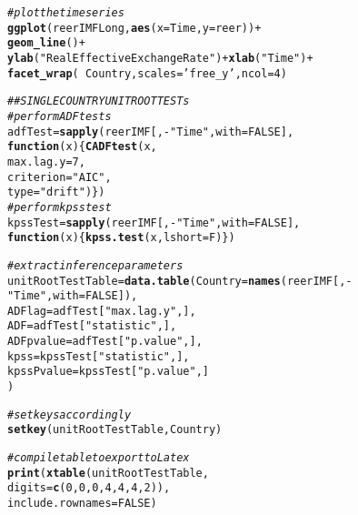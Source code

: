 \documentclass{article}\usepackage[]{graphicx}\usepackage[]{color}
\makeatletter
\newcommand{\hlnum}[1]{\textcolor[rgb]{0.686,0.059,0.569}{#1}}%
\newcommand{\hlstr}[1]{\textcolor[rgb]{0.192,0.494,0.8}{#1}}%
\newcommand{\hlcom}[1]{\textcolor[rgb]{0.678,0.584,0.686}{\textit{#1}}}%
\newcommand{\hlopt}[1]{\textcolor[rgb]{0,0,0}{#1}}%
\newcommand{\hlstd}[1]{\textcolor[rgb]{0.345,0.345,0.345}{#1}}%
\newcommand{\hlkwa}[1]{\textcolor[rgb]{0.161,0.373,0.58}{\textbf{#1}}}%
\newcommand{\hlkwb}[1]{\textcolor[rgb]{0.69,0.353,0.396}{#1}}%
\newcommand{\hlkwc}[1]{\textcolor[rgb]{0.333,0.667,0.333}{#1}}%
\newcommand{\hlkwd}[1]{\textcolor[rgb]{0.737,0.353,0.396}{\textbf{#1}}}%
\newenvironment{kframe}{%
 \def\at@end@of@kframe{}%
 \ifinner\ifhmode%
  \def\at@end@of@kframe{\end{minipage}}%
  \begin{minipage}{\columnwidth}%
 \fi\fi%
 \def\FrameCommand##1{\hskip\@totalleftmargin \hskip-\fboxsep
 \colorbox{shadecolor}{##1}\hskip-\fboxsep
     \hskip-\linewidth \hskip-\@totalleftmargin \hskip\columnwidth}%
 \MakeFramed {\advance\hsize-\width
   \@totalleftmargin\z@ \linewidth\hsize
   \@setminipage}}%
 {\par\unskip\endMakeFramed%
 \at@end@of@kframe}
\newenvironment{knitrout}{}{} %
\makeatother
\begin{document}
\begin{knitrout}
\begin{kframe}
\begin{alltt}
\hlcom{#plot the time series}
\hlkwd{ggplot}\hlstd{(reerIMFLong,} \hlkwd{aes}\hlstd{(}\hlkwc{x} \hlstd{= Time,} \hlkwc{y} \hlstd{= reer))} \hlopt{+}
  \hlkwd{geom_line}\hlstd{()} \hlopt{+}
  \hlkwd{ylab}\hlstd{(}\hlstr{"Real Effective Exchange Rate"}\hlstd{)} \hlopt{+} \hlkwd{xlab}\hlstd{(}\hlstr{"Time"}\hlstd{)}\hlopt{+}
  \hlkwd{facet_wrap}\hlstd{(}\hlopt{~} \hlstd{Country,} \hlkwc{scales} \hlstd{=} \hlstr{'free_y'}\hlstd{,} \hlkwc{ncol} \hlstd{=} \hlnum{4}\hlstd{)}


\hlcom{## SINGLE COUNTRY UNIT ROOT TESTs}
\hlcom{# perform ADF tests}
\hlstd{adfTest} \hlkwb{=} \hlkwd{sapply}\hlstd{(reerIMF[,} \hlopt{-}\hlstr{"Time"}\hlstd{,} \hlkwc{with} \hlstd{=} \hlnum{FALSE}\hlstd{],}
                 \hlkwa{function}\hlstd{(}\hlkwc{x}\hlstd{) \{}\hlkwd{CADFtest}\hlstd{(x,}
                                       \hlkwc{max.lag.y} \hlstd{=} \hlnum{7}\hlstd{,}
                                       \hlkwc{criterion} \hlstd{=} \hlstr{"AIC"}\hlstd{,}
                                       \hlkwc{type} \hlstd{=} \hlstr{"drift"}\hlstd{)\})}
\hlcom{# perform kpss test}
\hlstd{kpssTest} \hlkwb{=} \hlkwd{sapply}\hlstd{(reerIMF[,} \hlopt{-}\hlstr{"Time"}\hlstd{,} \hlkwc{with} \hlstd{=} \hlnum{FALSE}\hlstd{],}
                  \hlkwa{function}\hlstd{(}\hlkwc{x}\hlstd{) \{}\hlkwd{kpss.test}\hlstd{(x,} \hlkwc{lshort} \hlstd{= F)\})}

\hlcom{# extract inference parameters}
\hlstd{unitRootTestTable} \hlkwb{=} \hlkwd{data.table}\hlstd{(}\hlkwc{Country} \hlstd{=} \hlkwd{names}\hlstd{(reerIMF[,} \hlopt{-}\hlstr{"Time"}\hlstd{,} \hlkwc{with} \hlstd{=} \hlnum{FALSE}\hlstd{]),}
                               \hlkwc{ADFlag} \hlstd{= adfTest[}\hlstr{"max.lag.y"}\hlstd{,],}
                               \hlkwc{ADF} \hlstd{= adfTest[}\hlstr{"statistic"}\hlstd{,],}
                               \hlkwc{ADFpvalue} \hlstd{= adfTest[}\hlstr{"p.value"}\hlstd{,],}
                               \hlkwc{kpss} \hlstd{= kpssTest[}\hlstr{"statistic"}\hlstd{,],}
                               \hlkwc{kpssPvalue} \hlstd{= kpssTest[}\hlstr{"p.value"}\hlstd{,]}
\hlstd{)}

\hlcom{# set keys accordingly}
\hlkwd{setkey}\hlstd{(unitRootTestTable, Country)}

\hlcom{# compile table to export to Latex}
\hlkwd{print}\hlstd{(}\hlkwd{xtable}\hlstd{(unitRootTestTable,}
             \hlkwc{digits} \hlstd{=} \hlkwd{c}\hlstd{(}\hlnum{0}\hlstd{,} \hlnum{0}\hlstd{,} \hlnum{0}\hlstd{,} \hlnum{4}\hlstd{,} \hlnum{4}\hlstd{,} \hlnum{4}\hlstd{,} \hlnum{2}\hlstd{)),}
      \hlkwc{include.rownames} \hlstd{=} \hlnum{FALSE}\hlstd{)}


\end{alltt}
\end{kframe}
\end{knitrout}
\end{document}
